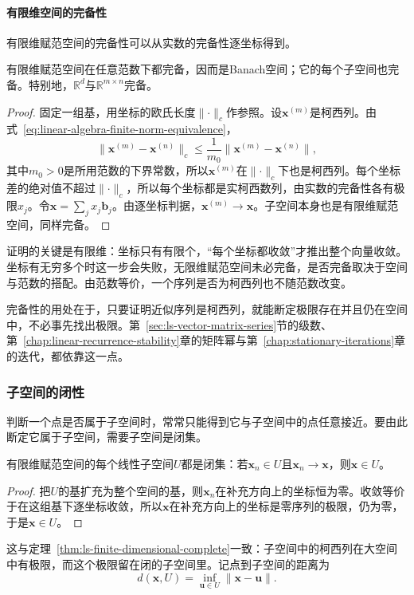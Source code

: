 \paragraph{有限维空间的完备性}
有限维赋范空间的完备性可以从实数的完备性逐坐标得到。
\begin{theorem}[有限维赋范空间的完备性]
\label{thm:ls-finite-dimensional-complete}
有限维赋范空间在任意范数下都完备，因而是Banach空间；它的每个子空间也完备。特别地，$\mathbb R^d$与$\mathbb R^{m\times n}$完备。
\end{theorem}
\begin{proof}
固定一组基，用坐标的欧氏长度$\lVert\cdot\rVert_c$作参照。设$\bm x^{(m)}$是柯西列。由式~\eqref{eq:linear-algebra-finite-norm-equivalence}，
\[
 \lVert\bm x^{(m)}-\bm x^{(n)}\rVert_c\leq\frac{1}{m_0}\lVert\bm x^{(m)}-\bm x^{(n)}\rVert,
\]
其中$m_0>0$是所用范数的下界常数，所以$\bm x^{(m)}$在$\lVert\cdot\rVert_c$下也是柯西列。每个坐标差的绝对值不超过$\lVert\cdot\rVert_c$，所以每个坐标都是实柯西数列，由实数的完备性各有极限$x_j$。令$\bm x=\sum_jx_j\bm b_j$。由逐坐标判据，$\bm x^{(m)}\to\bm x$。子空间本身也是有限维赋范空间，同样完备。
\end{proof}
证明的关键是有限维：坐标只有有限个，“每个坐标都收敛”才推出整个向量收敛。坐标有无穷多个时这一步会失败，无限维赋范空间未必完备，是否完备取决于空间与范数的搭配。由范数等价，一个序列是否为柯西列也不随范数改变。

完备性的用处在于，只要证明近似序列是柯西列，就能断定极限存在并且仍在空间中，不必事先找出极限。第~\ref{sec:ls-vector-matrix-series}节的级数、第~\ref{chap:linear-recurrence-stability}章的矩阵幂与第~\ref{chap:stationary-iterations}章的迭代，都依靠这一点。

\subsubsection{子空间的闭性}
\label{sec:ls-subspace-closedness}

判断一个点是否属于子空间时，常常只能得到它与子空间中的点任意接近。要由此断定它属于子空间，需要子空间是闭集。
\begin{theorem}[有限维子空间闭性]
\label{thm:ls-subspace-closed}
有限维赋范空间的每个线性子空间$U$都是闭集：若$\bm x_n\in U$且$\bm x_n\to\bm x$，则$\bm x\in U$。
\end{theorem}
\begin{proof}
把$U$的基扩充为整个空间的基，则$\bm x_n$在补充方向上的坐标恒为零。收敛等价于在这组基下逐坐标收敛，所以$\bm x$在补充方向上的坐标是零序列的极限，仍为零，于是$\bm x\in U$。
\end{proof}
这与定理~\ref{thm:ls-finite-dimensional-complete}一致：子空间中的柯西列在大空间中有极限，而这个极限留在闭的子空间里。记点到子空间的距离为
\begin{equation}
 d(\bm x,U)=\inf_{\bm u\in U}\lVert\bm x-\bm u\rVert.
 \label{eq:ls-distance-to-subspace}
\end{equation}

